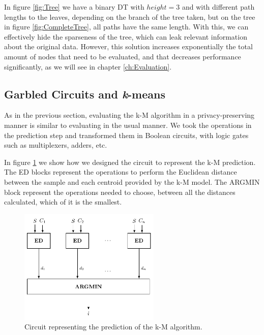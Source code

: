 In figure \ref{fig:Tree} we have a binary \ac{DT} with $height=3$ and with different path lengths to the leaves, depending on the branch of the tree taken, but on the tree in figure \ref{fig:CompleteTree}, all paths have the same length. With this, we can effectively hide the sparseness of the tree, which can leak relevant information about the original data. However, this solution increases exponentially the total amount of nodes that need to be evaluated, and that decreases performance significantly, as we will see in chapter \ref{ch:Evaluation}.
                


\subsection{Garbled Circuits and \textit{k}-means}
\label{ssec:GCandk-M}



As in the previous section, evaluating the \ac{k-M} algorithm in a privacy-preserving manner is similar to evaluating in the usual manner. We took the operations in the prediction step and transformed them in Boolean circuits, with logic gates such as multiplexers, adders, etc.

In figure \ref{fig:kmeans} we show how we designed the circuit to represent the \ac{k-M} prediction. The ED blocks represent the operations to perform the Euclidean distance between the sample and each centroid provided by the \ac{k-M} model. The ARGMIN block represent the operations needed to choose, between all the distances calculated, which of it is the smallest.


\begin{figure}[H]
  \centering
  \includegraphics[width=0.60\textwidth]{images/k-means.pdf}
  \caption{Circuit representing the prediction of the \ac{k-M} algorithm.}
  \label{fig:kmeans}
\end{figure}


